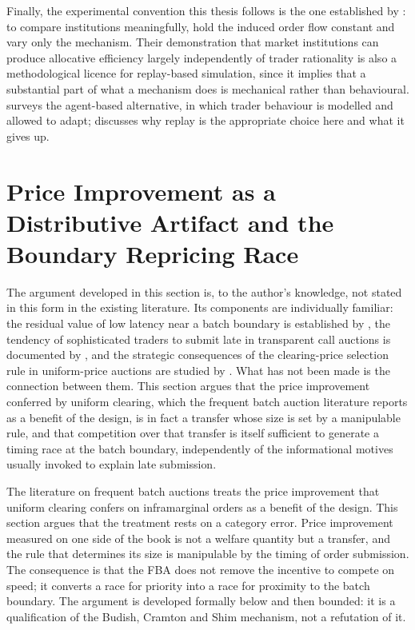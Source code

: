 Finally, the experimental convention this thesis follows is the one
established by \citet{gode1993allocative}: to compare institutions
meaningfully, hold the induced order flow constant and vary only the
mechanism. Their demonstration that market institutions can produce
allocative efficiency largely independently of trader rationality is
also a methodological licence for replay-based simulation, since it
implies that a substantial part of what a mechanism does is mechanical
rather than behavioural. \citet{lebaron2006agent} surveys the
agent-based alternative, in which trader behaviour is modelled and
allowed to adapt;  discusses why replay is the
appropriate choice here and what it gives up.

\section{Price Improvement as a Distributive Artifact and the Boundary
Repricing Race}
\label{sec:priceimprovement}

The argument developed in this section is, to the author's knowledge, not
stated in this form in the existing literature. Its components are
individually familiar: the residual value of low latency near a batch
boundary is established by \citet{schlegel2023transaction}, the tendency
of sophisticated traders to submit late in transparent call auctions is
documented by \citet{daures2026click}, and the strategic consequences of
the clearing-price selection rule in uniform-price auctions are studied
by \citet{burkett2020uniform}. What has not been made is the connection
between them. This section argues that the price improvement conferred
by uniform clearing, which the frequent batch auction literature reports
as a benefit of the design, is in fact a transfer whose size is set by a
manipulable rule, and that competition over that transfer is itself
sufficient to generate a timing race at the batch boundary, independently
of the informational motives usually invoked to explain late submission.


The literature on frequent batch auctions treats the price improvement
that uniform clearing confers on inframarginal orders as a benefit of
the design. This section argues that the treatment rests on a category
error. Price improvement measured on one side of the book is not a
welfare quantity but a transfer, and the rule that determines its size
is manipulable by the timing of order submission. The consequence is
that the FBA does not remove the incentive to compete on speed; it
converts a race for priority into a race for proximity to the batch
boundary. The argument is developed formally below and then bounded:
it is a qualification of the Budish, Cramton and Shim mechanism, not a
refutation of it.

